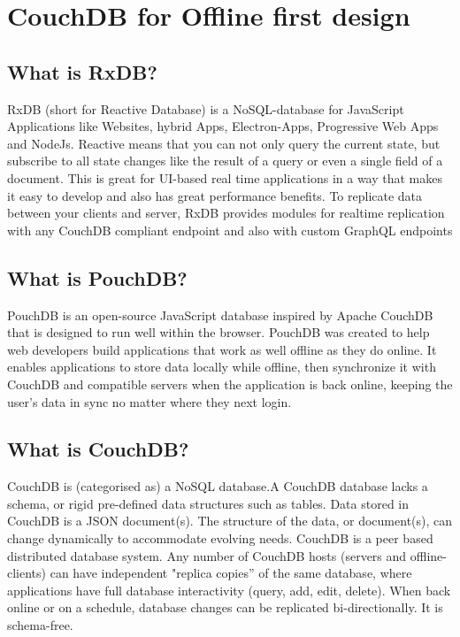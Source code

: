 \section{CouchDB for Offline first design}

\subsection{What is RxDB?}

RxDB (short for Reactive Database) is a NoSQL-database for JavaScript Applications 
like Websites, hybrid Apps, Electron-Apps, Progressive Web Apps and NodeJs. 
Reactive means that you can not only query the current state, but subscribe to all state 
changes like the result of a query or even a single field of a document. This is great 
for UI-based real time applications in a way that makes it easy to develop and also has 
great performance benefits. To replicate data between your clients and server, RxDB 
provides modules for realtime replication with any CouchDB compliant endpoint and 
also with custom GraphQL endpoints

\subsection{What is PouchDB?}

PouchDB is an open-source JavaScript database inspired by Apache CouchDB that is designed to run well within the browser.
PouchDB was created to help web developers build applications that work as well offline as they do online.
It enables applications to store data locally while offline, then synchronize it with CouchDB and compatible servers when the application is back online, keeping the user's data in sync no matter where they next login.

\subsection{What is CouchDB?}

CouchDB is (categorised as) a NoSQL database.A CouchDB database lacks a schema, or rigid pre-defined data structures such as tables. Data stored in CouchDB is a JSON document(s). The structure of the data, or document(s), can change dynamically to accommodate evolving needs.  
CouchDB is a peer based distributed database system. Any number of CouchDB hosts (servers and offline-clients) can have independent "replica copies'' of the same database, where applications have full database interactivity (query, add, edit, delete). When back online or on a schedule, database changes can be replicated bi-directionally.
It is schema-free.

